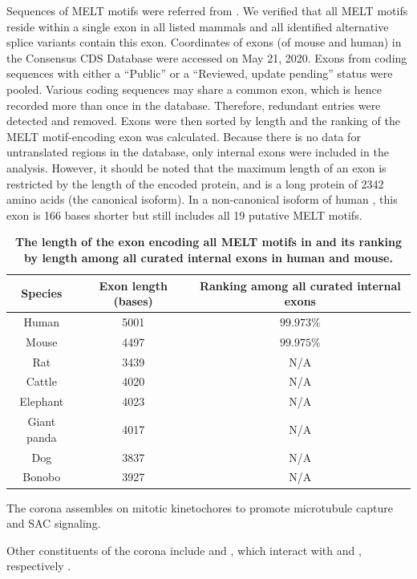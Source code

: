 \begin{table}[H]
    \renewcommand{\arraystretch}{1.5}
    \caption{\textbf{The length of the exon encoding all MELT motifs in  and its ranking by length among all curated internal exons in human and mouse.}}
    \noindent\justifying Sequences of MELT motifs were referred from \cite{MELTEvolution}. We verified that all MELT motifs reside within a single exon in all listed mammals and all identified alternative splice variants contain this exon. Coordinates of exons (of mouse and human) in the Consensus CDS Database were accessed on May 21, 2020. Exons from coding sequences with either a ``Public'' or a ``Reviewed, update pending'' status were pooled. Various coding sequences may share a common exon, which is hence recorded more than once in the database. Therefore, redundant entries were detected and removed. Exons were then sorted by length and the ranking of the MELT motif-encoding exon was calculated. Because there is no data for untranslated regions in the database, only internal exons were included in the analysis. However, it should be noted that the maximum length of an exon is restricted by the length of the encoded protein, and  is a long protein of \SI{2342}{} amino acids (the canonical isoform). In a non-canonical isoform of human , this exon is 166 bases shorter but still includes all 19 putative MELT motifs.
    \label{ExonLength}
    \begin{center}
        \begin{tabular}{c c c}
            \hline
            Species & Exon length (bases) & Ranking among all curated internal exons\\
            \hline
            Human & 5001 & $99.973\%$\\
            Mouse & 4497 & $99.975\%$\\
            Rat & 3439 & N/A\\
            Cattle & 4020 & N/A\\
            Elephant & 4023 & N/A\\ %
            Giant panda & 4017 & N/A\\
            Dog & 3837 & N/A\\
            Bonobo & 3927 & N/A\\
            \hline
        \end{tabular}
    \end{center}
\end{table}

The corona assembles on mitotic kinetochores to promote microtubule capture and SAC signaling.

Other constituents of the corona include  and , which interact with  and , respectively \cite{CENPELocalization-BUBR1, CENP-FLimitsStripping}.